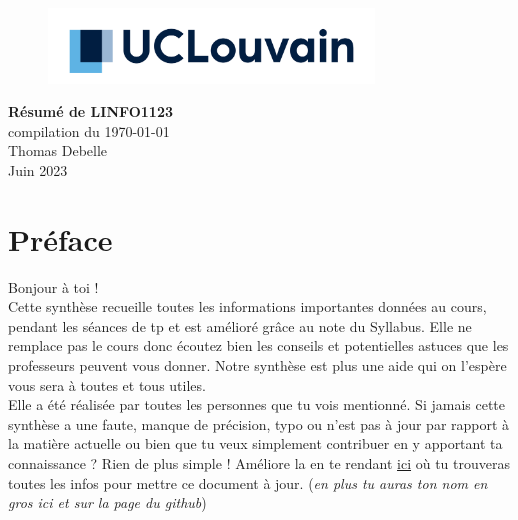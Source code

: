 \documentclass{report}
\begin{document}
\begin{titlepage}
    \begin{figure}
        \includegraphics[height = 2cm]{UCL_Logo.png}
        \label{fig:my_label}
    \end{figure}

    \hspace*{100cm}
    \centering
    \vspace*{7cm}

    {\Huge \textbf{Résumé de LINFO1123}}\\
    \vspace*{0.25cm}
    compilation du \today\\
    \vspace*{0.25cm}
    \Large{Thomas Debelle}\\

    \vspace*{9.5cm} %
    {\Large Juin 2023}
\end{titlepage}

\tableofcontents
\newpage

\section*{Préface}

Bonjour à toi !\\

Cette synthèse recueille toutes les informations importantes données au cours, pendant les séances de tp et est amélioré grâce au note du Syllabus. Elle ne remplace pas le cours donc écoutez bien les conseils et potentielles astuces que les professeurs peuvent vous donner. Notre synthèse est plus une aide qui on l'espère vous sera à toutes et tous utiles.\\

Elle a été réalisée par toutes les personnes que tu vois mentionné. Si jamais cette synthèse a une faute, manque de précision, typo ou n'est pas à jour par rapport à la matière actuelle ou bien que tu veux simplement contribuer en y apportant ta connaissance ? Rien de plus simple ! Améliore la en te rendant \href{http://www.github.com/Tfloow/Q4_EPL}{ici} où tu trouveras toutes les infos pour mettre ce document à jour. (\textit{en plus tu auras ton nom en gros ici et sur la page du github})\\
\end{document}
